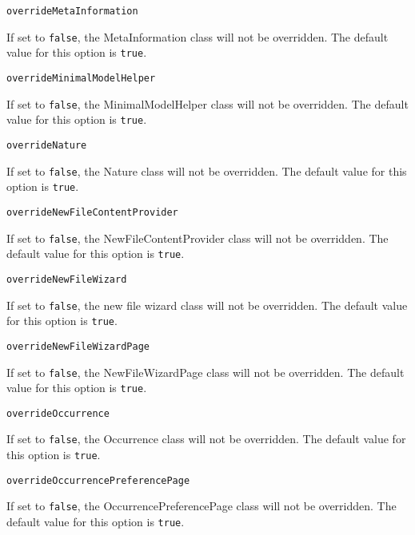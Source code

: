 \noindent\texttt{overrideMetaInformation}
\begin{myindentpar}{1cm}
If set to \texttt{false}, the MetaInformation class will not be overridden. The default value for this option is \texttt{true}.
\end{myindentpar}

\noindent\texttt{overrideMinimalModelHelper}
\begin{myindentpar}{1cm}
If set to \texttt{false}, the MinimalModelHelper class will not be overridden. The default value for this option is \texttt{true}.
\end{myindentpar}

\noindent\texttt{overrideNature}
\begin{myindentpar}{1cm}
If set to \texttt{false}, the Nature class will not be overridden. The default value for this option is \texttt{true}.
\end{myindentpar}

\noindent\texttt{overrideNewFileContentProvider}
\begin{myindentpar}{1cm}
If set to \texttt{false}, the NewFileContentProvider class will not be overridden. The default value for this option is \texttt{true}.
\end{myindentpar}

\noindent\texttt{overrideNewFileWizard}
\begin{myindentpar}{1cm}
If set to \texttt{false}, the new file wizard class will not be overridden. The default value for this option is \texttt{true}.
\end{myindentpar}

\noindent\texttt{overrideNewFileWizardPage}
\begin{myindentpar}{1cm}
If set to \texttt{false}, the NewFileWizardPage class will not be overridden. The default value for this option is \texttt{true}.
\end{myindentpar}

\noindent\texttt{overrideOccurrence}
\begin{myindentpar}{1cm}
If set to \texttt{false}, the Occurrence class will not be overridden. The default value for this option is \texttt{true}.
\end{myindentpar}

\noindent\texttt{overrideOccurrencePreferencePage}
\begin{myindentpar}{1cm}
If set to \texttt{false}, the OccurrencePreferencePage class will not be overridden. The default value for this option is \texttt{true}.
\end{myindentpar}

